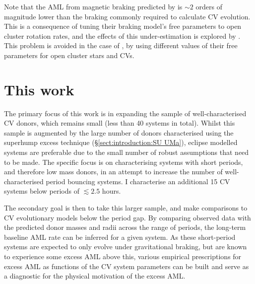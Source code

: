 Note that the AML from magnetic braking predicted by \citet{matt2015} is $\sim 2$ orders of magnitude lower than the braking commonly required to calculate CV evolution. This is a consequence of tuning their braking model's free parameters to open cluster rotation rates, and the effects of this under-estimation is explored by \citet{andronov2003}. This problem is avoided in the case of \citet{garraffo2018a,garraffo2018b}, by using different values of their free parameters for open cluster stars and CVs.


\section{This work}
\label{sect:introduction:this work}

The primary focus of this work is in expanding the sample of well-characterised CV donors, which remains small (less than 40 systems in total). Whilst this sample is augmented by the large number of donors characterised using the superhump excess technique (\S\ref{sect:introduction:SU UMa}), eclipse modelled systems are preferable due to the small number of robust assumptions that need to be made. The specific focus is on characterising systems with short periods, and therefore low mass donors, in an attempt to increase the number of well-characterised period bouncing systems. I characterise an additional 15 CV systems below periods of $\lesssim 2.5$ hours.

The secondary goal is then to take this larger sample, and make comparisons to CV evolutionary models below the period gap. By comparing observed data with the predicted donor masses and radii across the range of periods, the long-term baseline AML rate can be inferred for a given system. As these short-period systems are expected to only evolve under gravitational braking, but are known to experience some excess AML above this, various empirical prescriptions for excess AML as functions of the CV system parameters can be built and serve as a diagnostic for the physical motivation of the excess AML.

